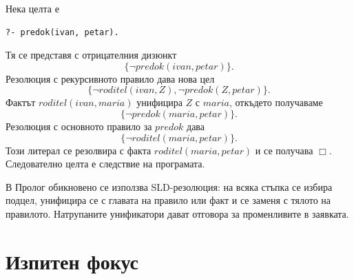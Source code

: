 \begin{example}
Нека целта е
\begin{verbatim}
?- predok(ivan, petar).
\end{verbatim}
Тя се представя с отрицателния дизюнкт
\[
\{\neg predok(ivan,petar)\}.
\]
Резолюция с рекурсивното правило дава нова цел
\[
\{
\neg roditel(ivan,Z),
\neg predok(Z,petar)
\}.
\]
Фактът $roditel(ivan,maria)$ унифицира $Z$ с $maria$, откъдето получаваме
\[
\{\neg predok(maria,petar)\}.
\]
Резолюция с основното правило за $predok$ дава
\[
\{\neg roditel(maria,petar)\}.
\]
Този литерал се резолвира с факта $roditel(maria,petar)$ и се получава $\Box$. Следователно целта е следствие на програмата.
\end{example}

\begin{remark}
В Пролог обикновено се използва SLD-резолюция: на всяка стъпка се избира подцел, унифицира се с главата на правило или факт и се заменя с тялото на правилото. Натрупаните унификатори дават отговора за променливите в заявката.
\end{remark}

\section{Изпитен фокус}\label{s:22.6}

